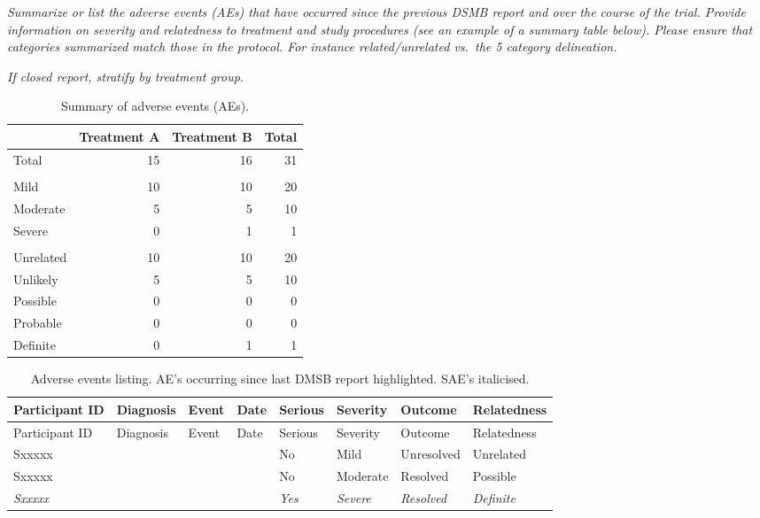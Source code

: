 \documentclass[
  11pt,
]{article}
\begin{document}
\emph{Summarize or list the adverse events (AEs) that have occurred since the previous DSMB report and over the course of the trial. Provide information on severity and relatedness to treatment and study procedures (see an example of a summary table below). Please ensure that categories summarized match those in the protocol. For instance related/unrelated vs.~the 5 category delineation.}

\emph{If closed report, stratify by treatment group}.

\begin{table}

\caption{\label{tab:unnamed-chunk-4}Summary of adverse events (AEs).}
\centering
\begin{tabular}[t]{lrrr}
\toprule
  & Treatment A & Treatment B & Total\\
\midrule
Total & 15 & 16 & 31\\
\addlinespace[0.3em]
\multicolumn{4}{l}{\textbf{Number of AEs by severity}}\\
\hspace{1em}Mild & 10 & 10 & 20\\
\hspace{1em}Moderate & 5 & 5 & 10\\
\hspace{1em}Severe & 0 & 1 & 1\\
\addlinespace[0.3em]
\multicolumn{4}{l}{\textbf{Number of AEs by relatedness}}\\
\hspace{1em}Unrelated & 10 & 10 & 20\\
\hspace{1em}Unlikely & 5 & 5 & 10\\
\hspace{1em}Possible & 0 & 0 & 0\\
\hspace{1em}Probable & 0 & 0 & 0\\
\hspace{1em}Definite & 0 & 1 & 1\\
\bottomrule
\end{tabular}
\end{table}

\begin{longtable}[]{@{}llllllll@{}}
\caption{Adverse events listing. AE's occurring since last DMSB report highlighted. SAE's italicised.}\tabularnewline
\toprule
Participant ID & Diagnosis & Event & Date & Serious & Severity & Outcome & Relatedness\tabularnewline
\midrule
\endfirsthead
\toprule
Participant ID & Diagnosis & Event & Date & Serious & Severity & Outcome & Relatedness\tabularnewline
\midrule
\endhead
Sxxxxx & & & & No & Mild & Unresolved & Unrelated\tabularnewline
Sxxxxx & & & & No & Moderate & Resolved & Possible\tabularnewline
\emph{Sxxxxx} & & & & \emph{Yes} & \emph{Severe} & \emph{Resolved} & \emph{Definite}\tabularnewline
\bottomrule
\end{longtable}
\end{document}

